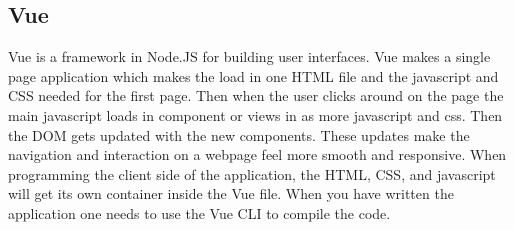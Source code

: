 \subsection{Vue}
Vue is a framework in Node.JS for building user interfaces. Vue makes a single page application which makes the load in one HTML file and the javascript and CSS needed for the first page. Then when the user clicks around on the page the main javascript loads in component or views in as more javascript and css. Then the DOM gets updated with the new components. These updates make the navigation and interaction on a webpage feel more smooth and responsive. When programming the client side of the application, the HTML, CSS, and javascript will get its own container inside the Vue file. When you have written the application one needs to use the Vue CLI to compile the code.





